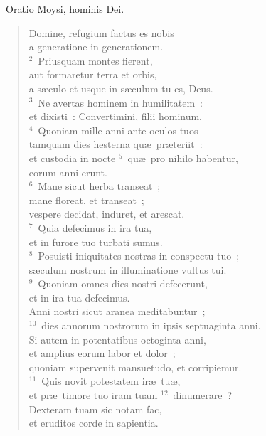 ~\lettrine[lines=10,image=true,loversize=0.05,lraise=-0.03]{O}{}ratio Moysi, hominis Dei. \begin{flushleft}\begin{verse}\vspace{6pt}Domine, refugium factus es nobis\\ a generatione in generationem.\\
${}^{2}$~Priusquam montes fierent,\\ aut formaretur terra et orbis,\\ a s\ae culo et usque in s\ae culum tu es, Deus.\\
${}^{3}$~Ne avertas hominem in humilitatem~:\\ et dixisti~: Convertimini, filii hominum.\\
${}^{4}$~Quoniam mille anni ante oculos tuos\\ tamquam dies hesterna qu\ae\ pr\ae teriit~:\\ et custodia in nocte
${}^{5}$~qu\ae\ pro nihilo habentur,\\ eorum anni erunt.\\
${}^{6}$~Mane sicut herba transeat~;\\ mane floreat, et transeat~;\\ vespere decidat, induret, et arescat.\\
${}^{7}$~Quia defecimus in ira tua,\\ et in furore tuo turbati sumus.\\
${}^{8}$~Posuisti iniquitates nostras in conspectu tuo~;\\ s\ae culum nostrum in illuminatione vultus tui.\\
${}^{9}$~Quoniam omnes dies nostri defecerunt,\\ et in ira tua defecimus.\\ Anni nostri sicut aranea meditabuntur~;\\
${}^{10}$~dies annorum nostrorum in ipsis septuaginta anni.\\ Si autem in potentatibus octoginta anni,\\ et amplius eorum labor et dolor~;\\ quoniam supervenit mansuetudo, et corripiemur.\\
${}^{11}$~Quis novit potestatem ir\ae\ tu\ae ,\\ et pr\ae\ timore tuo iram tuam
${}^{12}$~dinumerare~?\\ Dexteram tuam sic notam fac,\\ et eruditos corde in sapientia.\\

\end{verse}
\end{flushleft}
